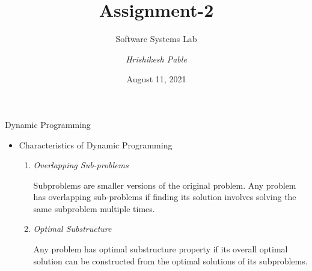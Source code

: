 \documentclass{beamer}[10pt]
\title{\textrm{Assignment-2}}
\subtitle{\textrm{Software Systems Lab}}
\author{\textit{Hrishikesh Pable }}
\institute{IIT Dharwad \\
\href{https://www.iitdh.ac.in/}{\texttt{https://www.iitdh.ac.in/}}}
\date{August 11, 2021}
\begin{document}
\maketitle





    

\begin{frame}{Dynamic Programming}
\begin{itemize}
    \item Characteristics of Dynamic Programming
    \begin{enumerate}
        \item \textit{Overlapping Sub-problems}
        \begin{block}{1}
            Subproblems are smaller versions of the original problem. Any problem has overlapping sub-problems if finding its solution involves solving the same subproblem multiple times.
        \end{block}
        \item \textit{Optimal Substructure}
        \begin{block}{2}
            Any problem has optimal substructure property if its overall optimal solution can be constructed from the optimal solutions of its subproblems.
        \end{block}
    \end{enumerate}
\end{itemize}
    
\end{frame}
\end{document}
